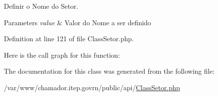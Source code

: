 Definir o Nome do Setor. 


\begin{DoxyParams}{Parameters}
{\em value} & Valor do Nome a ser definido \\
\hline
\end{DoxyParams}


Definition at line 121 of file Class\+Setor.\+php.

Here is the call graph for this function\+:


The documentation for this class was generated from the following file\+:\begin{DoxyCompactItemize}
\item 
/var/www/chamador.\+itep.\+govrn/public/api/\hyperlink{_class_setor_8php}{Class\+Setor.\+php}\end{DoxyCompactItemize}
